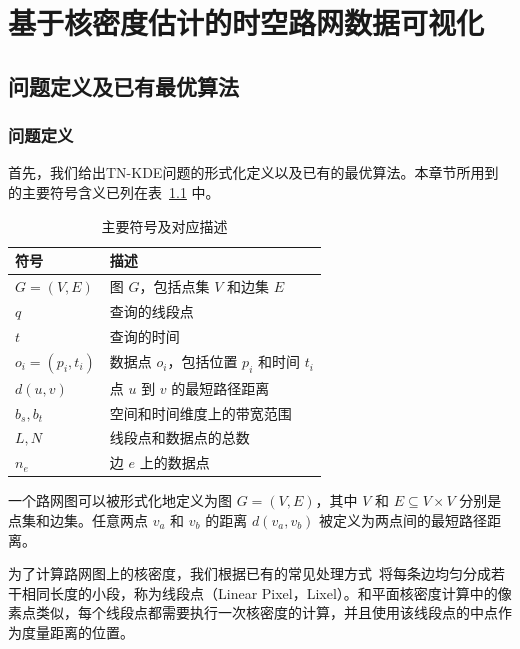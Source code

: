 \chapter{基于核密度估计的时空路网数据可视化}
\label{sec3:paper1}

\section{问题定义及已有最优算法}
\label{sec3:preliminaries}

\subsection{问题定义}

首先，我们给出TN-KDE问题的形式化定义以及已有的最优算法。本章节所用到的主要符号含义已列在表~\ref{tab:symbols} 中。

\begin{table}[h]
	\centering
	\def\arraystretch{1.5}
	\caption{主要符号及对应描述}
	\label{tab:symbols}
	\begin{tabular}{l|l}
	\hline
	符号  & 描述 \\ \hline\hline
	$G=(V,E)$      & 图 $G$，包括点集 $V$ 和边集 $E$ \\
	$q$	     	   & 查询的线段点 \\
	$t$		       & 查询的时间 \\
	$o_i = (p_i, t_i)$ & 数据点 $o_i$，包括位置 $p_i$ 和时间 $t_i$ \\
	$d(u, v)$      & 点 $u$ 到 $v$ 的最短路径距离 \\
	$b_s, b_t$     & 空间和时间维度上的带宽范围 \\
	$L, N$		   & 线段点和数据点的总数 \\
	$n_e$          & 边 $e$ 上的数据点 \\
	\hline
	\end{tabular}
\end{table}

\begin{definition}[路网图]
一个路网图可以被形式化地定义为图 $G = (V, E)$，其中 $V$ 和 $E \subseteq V \times V$ 分别是点集和边集。任意两点 $v_a$ 和 $v_b$ 的距离 $d(v_a, v_b)$ 被定义为两点间的最短路径距离。
\end{definition}

为了计算路网图上的核密度，我们根据已有的常见处理方式~\cite{xie_kernel_2008, chan_fast_2021}将每条边均匀分成若干相同长度的小段，称为线段点（Linear Pixel，Lixel）。和平面核密度计算中的像素点类似，每个线段点都需要执行一次核密度的计算，并且使用该线段点的中点作为度量距离的位置。

